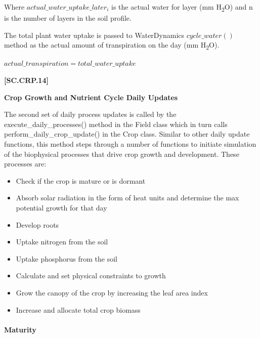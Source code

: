 Where \(actual\_water\_uptake\_later_i\) is the actual water for layer (mm H\textsubscript{2}O) and n is the number of layers in the soil profile. 

The total plant water uptake is passed to WaterDynamics \(cycle\_water()\) method as the actual amount of transpiration on the day (mm H\textsubscript{2}O).
    \vspace{0.2cm}

    \begin{center}
        \(actual\_transpiration =total\_water\_uptake\)
    \end{center}
        \vspace{0.5cm}
    
            {\raggedleft \textbf{[SC.CRP.14]}\par}
            \vspace{0.5cm}

\textbf{\large Crop Growth and Nutrient Cycle Daily Updates}
\vspace{0.2cm}

The second set of daily process updates is called by the execute\_daily\_processes() method in the Field class which in turn calls perform\_daily\_crop\_update() in the Crop class. Similar to other daily update functions, this method steps through a number of functions to initiate simulation of the biophysical processes that drive crop growth and development. These processes are:
\begin{itemize}
    \item Check if the crop is mature or is dormant
    \item Absorb solar radiation in the form of heat units and determine the max potential growth for that day
    \item Develop roots
    \item Uptake nitrogen from the soil
    \item Uptake phosphorus from the soil
    \item Calculate and set physical constraints to growth
    \item Grow the canopy of the crop by increasing the leaf area index
    \item Increase and allocate total crop biomass
\end{itemize}
\vspace{0.2cm}

\paragraph{Maturity}
\vspace{-0.25cm}

